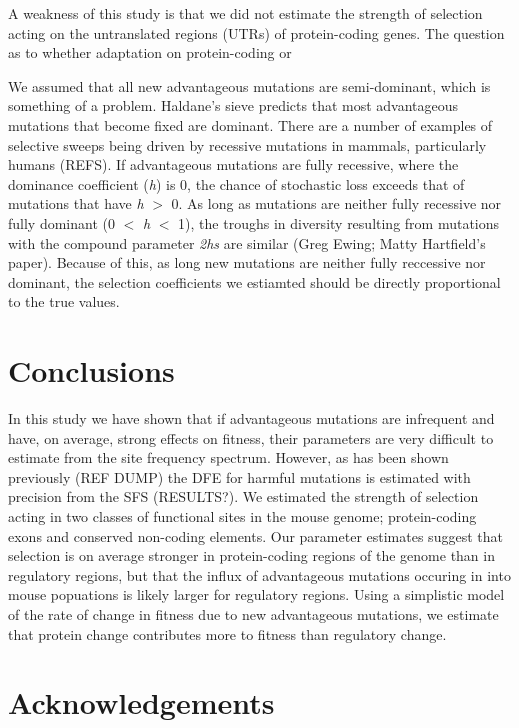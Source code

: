 \documentclass[11pt]{article}
\begin{document}



A weakness of this study is that we did not estimate the strength of selection acting on the untranslated regions (UTRs) of protein-coding genes. The question as to whether adaptation on protein-coding or 

We assumed that all new advantageous mutations are semi-dominant, which is something of a problem. Haldane's sieve predicts that most advantageous mutations that become fixed are dominant. There are a number of examples of selective sweeps being driven by recessive mutations in mammals, particularly humans (REFS). If advantageous mutations are fully recessive, where the dominance coefficient (\textit{h}) is 0, the chance of stochastic loss exceeds that of mutations that have \textit{h} $>$ 0. As long as mutations are neither fully recessive nor fully dominant (0 $<$ \textit{h} $<$ 1), the troughs in diversity resulting from mutations with the compound parameter \textit{2hs} are similar (Greg Ewing; Matty Hartfield's paper). Because of this, as long new mutations are neither fully reccessive nor dominant, the selection coefficients we estiamted should be directly proportional to the true values.

\section*{Conclusions}

In this study we have shown that if advantageous mutations are infrequent and have, on average, strong effects on fitness, their parameters are very difficult to estimate from the site frequency spectrum. However, as has been shown previously (REF DUMP) the DFE for harmful mutations is estimated with precision from the SFS (RESULTS?). We estimated the strength of selection acting in two classes of functional sites in the mouse genome; protein-coding exons and conserved non-coding elements. Our parameter estimates suggest that selection is on average stronger in protein-coding regions of the genome than in regulatory regions, but that the influx of advantageous mutations occuring in into mouse popuations is likely larger for regulatory regions. Using a simplistic model of the rate of change in fitness due to new advantageous mutations, we estimate that protein change contributes more to fitness than regulatory change.

\section*{Acknowledgements}
\end{document}

